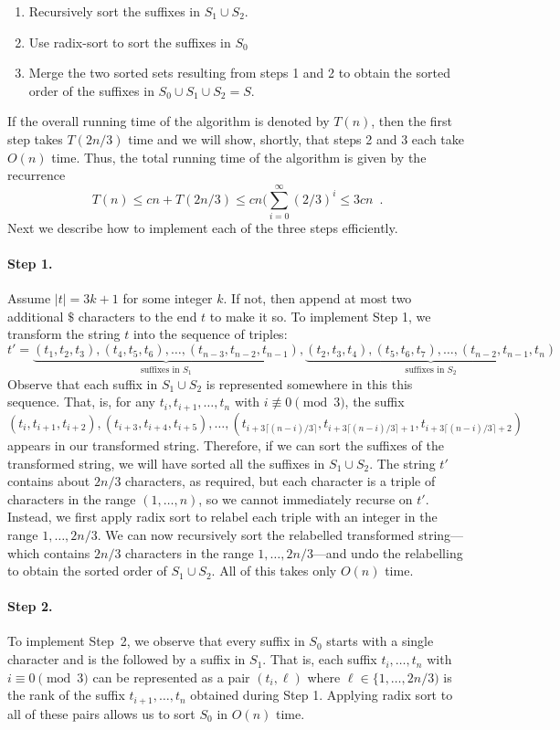 \begin{enumerate}
  \item Recursively sort the suffixes in $S_1\cup S_2$.
  \item Use radix-sort to sort the suffixes in $S_0$
  \item Merge the two sorted sets resulting from steps 1 and 2 to obtain    the      sorted order of the suffixes in $S_0\cup S_1\cup S_2=S$.
\end{enumerate}
If the overall running time of the algorithm is denoted by $T(n)$, then the first step takes $T(2n/3)$ time and we will show, shortly, that steps 2 and 3 each take $O(n)$ time.  Thus, the total running time of the algorithm is given by the recurrence
\[
    T(n) \le cn + T(2n/3) \le cn(\sum_{i=0}^\infty (2/3)^i \le 3cn \enspace .
\]
Next we describe how to implement each of the three steps efficiently.

\paragraph{Step 1.}
Assume $|t|=3k+1$ for some integer $k$. If not, then append at most two additional $\$$ characters to the end $t$ to make it so.
To implement Step 1, we transform the string $t$ into the sequence of triples:
\[
   t'= \underbrace{(t_1,t_2,t_3),(t_4,t_5,t_6),\ldots,(t_{n-3},t_{n-2},t_{n-1})}_\text{suffixes in $S_1$},
   \underbrace{(t_2,t_3,t_4),(t_5,t_6,t_7),\ldots,(t_{n-2},t_{n-1},t_{n})}_\text{suffixes in $S_2$}
\]
Observe that each suffix in $S_1\cup S_2$ is represented somewhere in this this sequence.  That, is, for any $t_i,t_{i+1},\ldots,t_n$ with $i\not\equiv 0\pmod 3$, the suffix 
\[
   (t_i,t_{i+1},t_{i+2}),(t_{i+3},t_{i+4},t_{i+5}),\ldots,
       (t_{i+3\lceil(n-i)/3\rceil},t_{i+3\lceil(n-i)/3\rceil+1},
       t_{i+3\lceil(n-i)/3\rceil+2})
\]
appears in our transformed string. Therefore, if we can sort the suffixes
of the transformed string, we will have sorted all the suffixes in
$S_1\cup S_2$.  The string $t'$ contains about $2n/3$ characters, as
required, but each character is a triple of characters in the range
$(1,\ldots,n)$, so we cannot immediately recurse on $t'$.  Instead,
we first apply radix sort to relabel each triple with an integer in
the range $1,\ldots,2n/3$.  We can now recursively sort the relabelled
transformed string---which contains $2n/3$ characters in the range
$1,\ldots,2n/3$---and undo the relabelling to obtain the sorted order
of $S_1\cup S_2$.  All of this takes only $O(n)$ time.

\paragraph{Step 2.}
To implement Step~2, we observe that every suffix in $S_0$ starts with
a single character and is the followed by a suffix in $S_1$.  That is,
each suffix $t_i,\ldots,t_n$ with $i\equiv 0\pmod 3$ can be represented
as a pair $(t_i,\ell)$ where $\ell\in\{1,\ldots,2n/3)$ is the rank of
the suffix $t_{i+1},\ldots,t_n$ obtained during Step 1.  Applying radix
sort to all of these pairs allows us to sort $S_0$ in $O(n)$ time.

